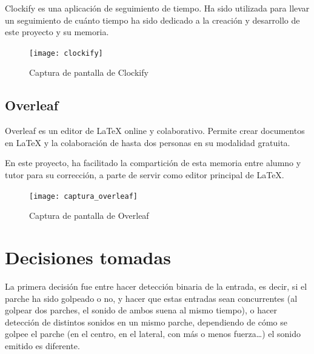             Clockify es una aplicación de seguimiento de tiempo. Ha sido utilizada para llevar un seguimiento de cuánto
            tiempo ha sido dedicado a la creación y desarrollo de este proyecto y su memoria.

            \begin{figure}[ht]
                \centering
                \texttt{[image: clockify]}
                \caption{Captura de pantalla de Clockify \label{fig:ClockifyCaptura}}
            \end{figure}


        \subsection{Overleaf} %
        \label{sub:Overleaf}

            Overleaf es un editor de LaTeX online y colaborativo. Permite crear documentos en LaTeX y la colaboración de
            hasta dos personas en su modalidad gratuita.

            En este proyecto, ha facilitado la compartición de esta memoria entre alumno y tutor para su corrección, a
            parte de servir como editor principal de LaTeX.

            \begin{figure}[ht]
                \centering
                \texttt{[image: captura\_overleaf]}
                \caption{Captura de pantalla de Overleaf \label{fig:OverleafCaptura}}
            \end{figure}



    \section{Decisiones tomadas} %
    \label{sec:DecisionesTomadas}

        La primera decisión fue entre hacer detección binaria de la entrada, es decir, si el parche ha sido golpeado o
        no, y hacer que estas entradas sean concurrentes (al golpear dos parches, el sonido de ambos suena al mismo
        tiempo), o hacer detección de distintos sonidos en un mismo parche, dependiendo de cómo se golpee el parche (en
        el centro, en el lateral, con más o menos fuerza…) el sonido emitido es diferente.\newline

